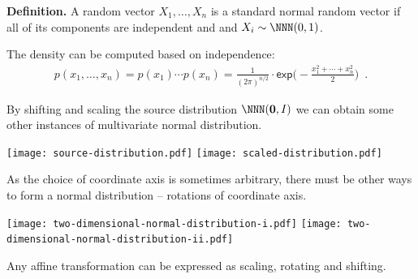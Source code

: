 \documentclass[landscape,footrule]{foils}
\renewcommand{\vec}[1]{\boldsymbol{#1}}
\begin{document}



\vspace*{-1.0cm}

\textbf{Definition.} A random vector $X_1,\ldots, X_n$ is a standard normal random vector if all of its components are independent and and $X_i\sim \NNN(0,1)$.
\begin{triangles}
\item The density can be computed based on independence:
\begin{align*}
p(x_1,\ldots,x_n)=p(x_1)\cdots p(x_n)=\frac{1}{(2\pi)^{n/2}}\cdot\mathsf{exp}\Biggl(-\frac{x_1^2+\cdots+x_n^2}{2}\Biggl)\enspace.
\end{align*}
\end{triangles}


By shifting and scaling the source distribution $\NNN(\vec{0},I)$ we can obtain some other instances of multivariate normal distribution.
\vspace*{-1cm}

\begin{center}
\texttt{[image: source-distribution.pdf]}
\texttt{[image: scaled-distribution.pdf]}
\end{center}\vspace*{-10cm}






As the choice of coordinate axis is sometimes arbitrary, there must be other ways to form a normal distribution -- rotations of coordinate axis.\vspace*{-1cm}  

\begin{center}
\texttt{[image: two-dimensional-normal-distribution-i.pdf]}
\texttt{[image: two-dimensional-normal-distribution-ii.pdf]}
\end{center}\vspace*{-1cm}

Any affine transformation can be expressed as scaling, rotating and shifting.




\end{document}
